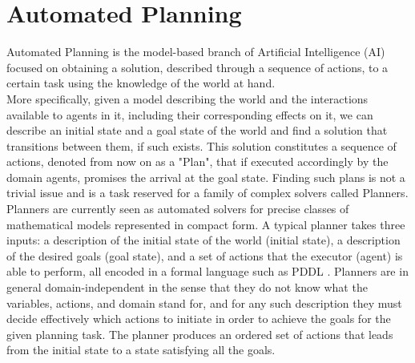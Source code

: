 \section{Automated Planning}
\label{background: automated}
Automated Planning is the model-based branch of Artificial Intelligence (AI) focused on obtaining a solution, described through
 a sequence of actions, to a certain task using the knowledge of the world at hand.\\
More specifically, given a model describing the world and the interactions available to agents in it, including their 
corresponding effects on it, we can describe an initial state and a goal state of the world and find a solution that 
transitions between them, if such exists. This solution constitutes a sequence of actions, denoted from now on as a "Plan", 
that if executed accordingly by the domain agents, promises the arrival at the goal state. Finding such plans is not a trivial 
issue and is a task reserved for a family of complex solvers called Planners.\\
Planners are currently seen as automated solvers for precise classes of mathematical models represented in compact form. A typical 
planner takes three inputs: a description of the initial state of the world (initial state), a description of the desired goals (goal state),
 and a set of actions that the executor (agent) is able to perform, all encoded in a formal language such as PDDL \cite{PDDL}. 
Planners are in  general domain-independent in the sense that they do not know what the variables, actions, and domain stand for,
and for any such description they must decide effectively which actions to initiate in order to achieve the goals for the given 
planning task. The planner produces an ordered set of actions that leads from the initial state to a state satisfying all the goals. 


\begin{definition}
    
    
\end{definition}

